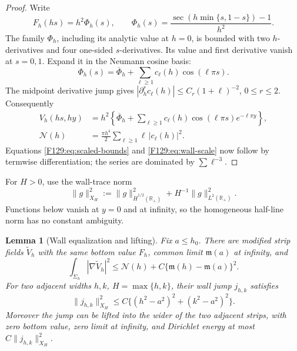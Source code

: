 \documentclass[11pt]{amsart}
\numberwithin{equation}{section}
\newtheorem{lemma}[theorem]{Lemma}
\theoremstyle{definition}
\theoremstyle{remark}
\begin{document}
\begin{proof}
Write
\begin{equation}\label{F129:eq:profile}
 F_h(hs)=h^2\Phi_h(s),\qquad
 \Phi_h(s)=\frac{\sec(h\min\{s,1-s\})-1}{h^2}.
\end{equation}
The family \(\Phi_h\), including its analytic value at \(h=0\), is bounded
with two \(h\)-derivatives and four one-sided \(s\)-derivatives.  Its value
and first derivative vanish at \(s=0,1\).  Expand it in the Neumann cosine
basis:
\begin{equation}
 \Phi_h(s)=\overline\Phi_h+\sum_{\ell\ge1}c_\ell(h)\cos(\ell\pi s).
\end{equation}
The midpoint derivative jump gives
\(|\partial_h^r c_\ell(h)|\le C_r(1+\ell)^{-2}\), \(0\le r\le2\).
Consequently
\begin{align}
 V_h(hs,hy)
 &=h^2\left\{\overline\Phi_h+
   \sum_{\ell\ge1}c_\ell(h)
   \cos(\ell\pi s)e^{-\ell\pi y}\right\},\label{F129:eq:scaled-V}\\
 \mathcal N(h)
 &=\frac{\pi h^4}{2}\sum_{\ell\ge1}\ell\,|c_\ell(h)|^2.\label{F129:eq:N-series}
\end{align}
Equations \eqref{F129:eq:scaled-bounds} and \eqref{F129:eq:wall-scale} now follow by
termwise differentiation; the series are dominated by
\(\sum\ell^{-3}\).
\end{proof}

For \(H>0\), use the wall-trace norm
\begin{equation}\label{F129:eq:XH}
 \|g\|_{X_H}^2
 :=\|g\|_{\dot H^{1/2}(\mathbb R_+)}^2
   +H^{-1}\|g\|_{L^2(\mathbb R_+)}^2.
\end{equation}
Functions below vanish at \(y=0\) and at infinity, so the homogeneous
half-line norm has no constant ambiguity.

\begin{lemma}[Wall equalization and lifting]\label{F129:lem:wall}
Fix \(a\le h_0\).  There are modified strip fields
\(\widetilde V_h\) with the same bottom value \(F_h\), common limit
\(\mathfrak m(a)\) at infinity, and
\begin{equation}\label{F129:eq:modified-energy}
 \int_{\Sigma_h}|\nabla\widetilde V_h|^2
 \le\mathcal N(h)+C\{\mathfrak m(h)-\mathfrak m(a)\}^2.
\end{equation}
For two adjacent widths \(h,k\), \(H=\max\{h,k\}\), their wall jump
\(j_{h,k}\) satisfies
\begin{equation}\label{F129:eq:jump}
 \|j_{h,k}\|_{X_H}^2
 \le C\{(h^2-a^2)^2+(k^2-a^2)^2\}.
\end{equation}
Moreover the jump can be lifted into the wider of the two adjacent strips,
with zero bottom value, zero limit at infinity, and Dirichlet energy at
most \(C\|j_{h,k}\|_{X_H}^2\).
\end{lemma}
\end{document}
